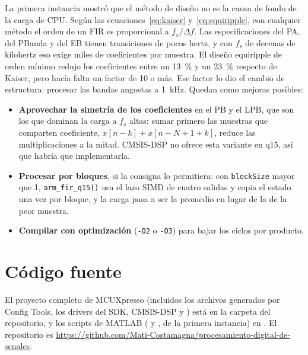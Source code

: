 \documentclass[11pt,a4paper]{article}
\begin{document}
La primera instancia mostró que el método de diseño no es la causa de
fondo de la carga de CPU. Según las ecuaciones~\eqref{eq:kaiser}
y~\eqref{eq:equiripple}, con cualquier método el orden de un FIR es
proporcional a $f_s/\Delta f$. Las especificaciones del PA, del PBanda y del
EB tienen transiciones de pocos hertz, y con $f_s$ de decenas de kilohertz
eso exige miles de coeficientes por muestra. El diseño equiripple de orden
mínimo redujo los coeficientes entre un \qty{13}{\percent} y un
\qty{23}{\percent} respecto de Kaiser, pero hacía falta un factor de 10 o
más. Ese factor lo dio el cambio de estructura: procesar las bandas
angostas a \qty{1}{\kilo\hertz}. Quedan como mejoras posibles:
\begin{itemize}[nosep]
  \item \textbf{Aprovechar la simetría de los coeficientes} en el PB y el
        LPB, que son los que dominan la carga a $f_s$ altas: sumar primero
        las muestras que comparten coeficiente, $x[n-k] + x[n-N+1+k]$,
        reduce las multiplicaciones a la mitad. CMSIS-DSP no ofrece esta
        variante en q15, así que habría que implementarla.
  \item \textbf{Procesar por bloques}, si la consigna lo permitiera: con
        \texttt{blockSize} mayor que 1, \texttt{arm\_fir\_q15()} usa el lazo
        SIMD de cuatro salidas y copia el estado una vez por bloque, y la
        carga pasa a ser la promedio en lugar de la de la peor muestra.
  \item \textbf{Compilar con optimización} (\texttt{-O2} o \texttt{-O3}) para
        bajar los ciclos por producto.
\end{itemize}

\clearpage
\appendix
\section{Código fuente}\label{sec:codigo}

El proyecto completo de MCUXpresso (incluidos los archivos generados por
Config Tools, los drivers del SDK, CMSIS-DSP y
) está en la carpeta  del
repositorio, y los scripts de MATLAB ( y
, de la primera instancia) en
. El repositorio es
\url{https://github.com/Mati-Costamagna/procesamiento-digital-de-senales}.
\end{document}
